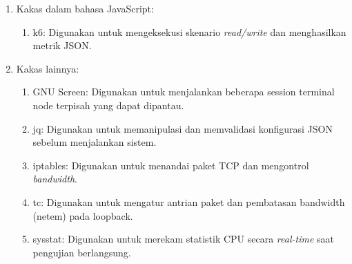 \begin{enumerate}
	\item Kakas dalam bahasa JavaScript:
	      \begin{enumerate}
		      \item k6: Digunakan untuk mengeksekusi skenario \textit{read/write} dan menghasilkan metrik JSON.
	      \end{enumerate}
	\item Kakas lainnya:
	      \begin{enumerate}
		      \item GNU Screen: Digunakan untuk menjalankan beberapa session terminal node terpisah yang dapat dipantau.
		      \item jq: Digunakan untuk memanipulasi dan memvalidasi konfigurasi JSON sebelum menjalankan sistem.
		      \item iptables: Digunakan untuk menandai paket TCP dan mengontrol \textit{bandwidth}.
		      \item tc: Digunakan untuk mengatur antrian paket dan pembatasan bandwidth (netem) pada loopback.
		      \item sysstat: Digunakan untuk merekam statistik CPU secara \textit{real-time} saat pengujian berlangsung.
	      \end{enumerate}
\end{enumerate}